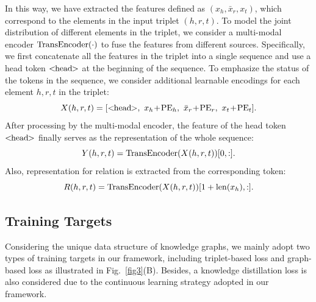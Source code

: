 In this way, we have extracted the features defined as $(x_h, \bar{x}_r, x_t)$, which correspond to the elements in the input triplet $(h, r, t)$. To model the joint distribution of different elements in the triplet, we consider a multi-modal encoder $\rm TransEncoder(\cdot)$ to fuse the features from different sources. Specifically, we first concatenate all the features in the triplet into a single sequence and use a head token $<\!\!{\rm head}\!\!>$ at the beginning of the sequence. To emphasize the status of the tokens in the sequence, we consider additional learnable encodings for each element $h, r, t$ in the triplet:
\begin{equation}
\label{concat}
    X(h, r, t) = [<\!\!{\rm head}\!\!>, \ x_h\!+\!{\rm PE}_h, \ \bar{x}_r\!+\!{\rm PE}_r, \ x_t\!+\!{\rm PE}_t].
\end{equation}
After processing by the multi-modal encoder, the feature of the head token $<\!\!{\rm head}\!\!>$ finally serves as the representation of the whole sequence:
\begin{equation}
    Y(h, r, t) = {\rm TransEncoder}(X(h, r, t))[0, :].
\end{equation}
Also, representation for relation is extracted from the corresponding token:
\begin{equation}
\label{relout}
    R(h, r, t) = {\rm TransEncoder}(X(h, r, t))[1+{\rm len}(x_h), :].
\end{equation}

\subsection{Training Targets}
Considering the unique data structure of knowledge graphs, we mainly adopt two types of training targets in our framework, including triplet-based loss and graph-based loss as illustrated in Fig.~\ref{fig3}(B). Besides, a knowledge distillation loss is also considered due to the continuous learning strategy adopted in our framework.

